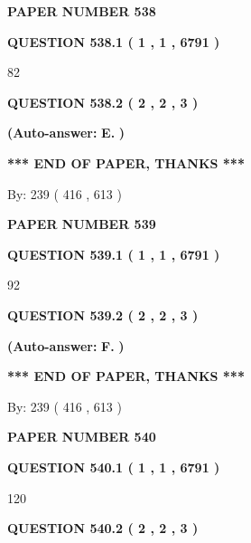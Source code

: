 \documentclass[12pt]{article}
\begin{document}
   
\newpage 
\setcounter{page}{ 
   538001 } 
   
   
 {\textbf{ \Large{ PAPER NUMBER  538  }}}
   
   
   
   
  
  
{\textbf{\large{QUESTION
538.1 
 ( 1 , 1 , 6791 )
}}}

82
  
  
{\textbf{\large{QUESTION
538.2 
 ( 2 , 2 , 3 )
}}}
 
 
{\textbf{(Auto-answer:}}
{\textbf{\large{
E.}}}
{\textbf{)}}
 
 
   
   
   
   
\vspace{1.0in} 
{\textbf{\large{ *** END OF PAPER, THANKS *** }}} 
   
   
\hspace{1.0in} By: 
 239 ( 416 ,  613 )
   
   
   
   
\newpage 
\setcounter{page}{ 
   539001 } 
   
   
 {\textbf{ \Large{ PAPER NUMBER  539  }}}
   
   
   
   
  
  
{\textbf{\large{QUESTION
539.1 
 ( 1 , 1 , 6791 )
}}}

92
  
  
{\textbf{\large{QUESTION
539.2 
 ( 2 , 2 , 3 )
}}}
 
 
{\textbf{(Auto-answer:}}
{\textbf{\large{
F.}}}
{\textbf{)}}
 
 
   
   
   
   
\vspace{1.0in} 
{\textbf{\large{ *** END OF PAPER, THANKS *** }}} 
   
   
\hspace{1.0in} By: 
 239 ( 416 ,  613 )
   
   
   
   
\newpage 
\setcounter{page}{ 
   540001 } 
   
   
 {\textbf{ \Large{ PAPER NUMBER  540  }}}
   
   
   
   
  
  
{\textbf{\large{QUESTION
540.1 
 ( 1 , 1 , 6791 )
}}}

120
  
  
{\textbf{\large{QUESTION
540.2 
 ( 2 , 2 , 3 )
}}}
 
\end{document}
